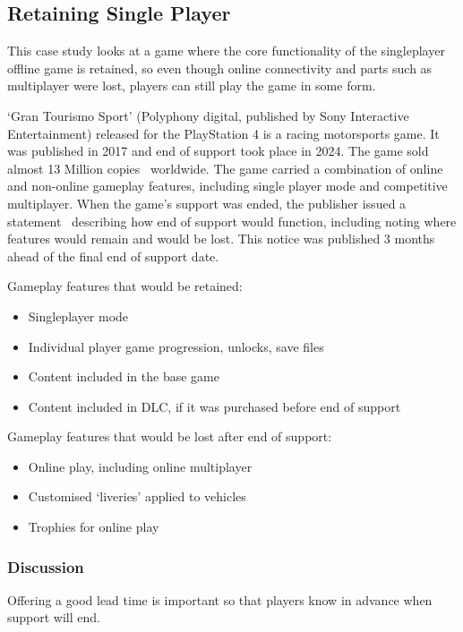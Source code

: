 \subsection{Retaining Single Player}
This case study looks at a game where the core functionality of the singleplayer offline game is retained,
so even though online connectivity and parts such as multiplayer were lost,
players can still play the game in some form.

`Gran Tourismo Sport' (Polyphony digital, published by Sony Interactive Entertainment) released for the PlayStation 4 is a racing motorsports game.
It was published in 2017 and end of support took place in 2024.
The game sold almost 13 Million copies~\cite{gtsport-sales-2023} worldwide.
The game carried a combination of online and non-online gameplay features, including single player mode and competitive multiplayer.
When the game's support was ended, the publisher issued a statement~\cite{gtsport-eos-2023} describing how end of support would function,
including noting where features would remain and would be lost.
This notice was published 3 months ahead of the final end of support date.

Gameplay features that would be retained:
\begin{itemize}
    \item Singleplayer mode
    \item Individual player game progression, unlocks, save files
    \item Content included in the base game
    \item Content included in DLC, if it was purchased before end of support
\end{itemize}

Gameplay features that would be lost after end of support:
\begin{itemize}
    \item Online play, including online multiplayer
    \item Customised `liveries' applied to vehicles
    \item Trophies for online play
\end{itemize}

\subsubsection*{Discussion}
Offering a good lead time is important so that players know in advance when support will end.

